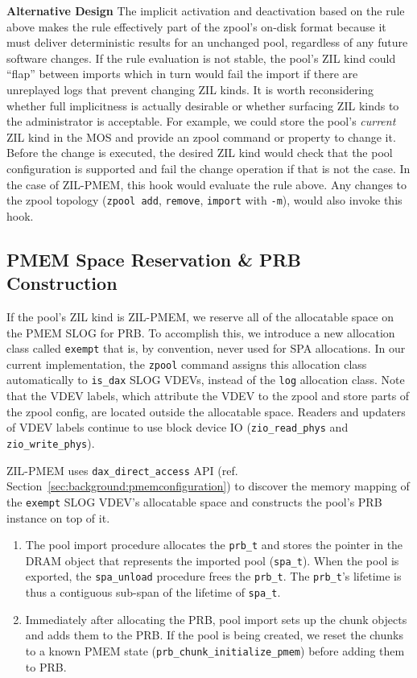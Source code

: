 \documentclass[12pt,a4paper,twoside]{book}
\begin{document}
\textbf{Alternative Design}
The implicit activation and deactivation based on the rule above makes the rule effectively part of the zpool's on-disk format because it must deliver deterministic results for an unchanged pool, regardless of any future software changes.
If the rule evaluation is not stable, the pool's ZIL kind could ``flap'' between imports which in turn would fail the import if there are unreplayed logs that prevent changing ZIL kinds.
It is worth reconsidering whether full implicitness is actually desirable or whether surfacing ZIL kinds to the administrator is acceptable.
For example, we could store the pool's \textit{current} ZIL kind in the MOS and provide an zpool command or property to change it.
Before the change is executed, the desired ZIL kind would check that the pool configuration is supported and fail the change operation if that is not the case.
In the case of ZIL-PMEM, this hook would evaluate the rule above.
Any changes to the zpool topology (\lstinline{zpool add}, \lstinline{remove}, \lstinline{import} with \lstinline{-m}), would also invoke this hook.

\subsection{PMEM Space Reservation \& PRB Construction}\label{sec:zilpmemzilkind:spacereservation}

If the pool's ZIL kind is ZIL-PMEM, we reserve all of the allocatable space on the PMEM SLOG for PRB.
To accomplish this, we introduce a new allocation class called \lstinline{exempt} that is, by convention, never used for SPA allocations.
In our current implementation, the \lstinline{zpool} command assigns this allocation class automatically to \lstinline{is_dax} SLOG VDEVs, instead of the \lstinline{log} allocation class.
Note that the VDEV labels, which attribute the VDEV to the zpool and store parts of the zpool config, are located outside the allocatable space.
Readers and updaters of VDEV labels continue to use block device IO (\lstinline{zio_read_phys} and \lstinline{zio_write_phys}).

ZIL-PMEM uses \lstinline{dax_direct_access} API (ref. Section~\ref{sec:background:pmemconfiguration}) to discover the memory mapping of the \lstinline{exempt} SLOG VDEV's allocatable space and constructs the pool's PRB instance on top of it.
\begin{enumerate}
\item The pool import procedure allocates the \lstinline{prb_t} and stores the pointer in the DRAM object that represents the imported pool (\lstinline{spa_t}).
When the pool is exported, the \lstinline{spa_unload} procedure frees the \lstinline{prb_t}.
The \lstinline{prb_t}'s lifetime is thus a contiguous sub-span of the lifetime of \lstinline{spa_t}.
\item  Immediately after allocating the PRB, pool import sets up the chunk objects and adds them to the PRB.
If the pool is being created, we reset the chunks to a known PMEM state (\lstinline{prb_chunk_initialize_pmem}) before adding them to PRB.
\end{enumerate}
\end{document}
